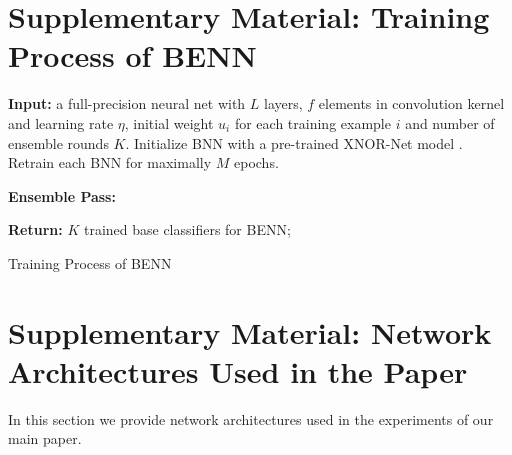\documentclass[10pt,twocolumn,letterpaper]{article}
\begin{document}
\newpage
\section{Supplementary Material: Training Process of BENN}
\label{sec:2}
\begin{algorithm}
	\SetAlgoLined
	\textbf{Input:} a full-precision neural net with $L$ layers, $f$ elements in convolution kernel and learning rate $\eta$, initial weight $u_{i}$ for each training example $i$ and number of ensemble rounds $K$. Initialize BNN with a pre-trained XNOR-Net model \cite{rastegari2016xnor}. Retrain each BNN for maximally $M$ epochs.
	
	\textbf{Ensemble Pass:}
	
	
    \textbf{Return:} $K$ trained base classifiers for BENN;
	
	\caption{Training Process of BENN}
\end{algorithm}

\newpage
\section{Supplementary Material: Network Architectures Used in the Paper}
\label{sec:3}
In this section we provide network architectures used in the experiments of our main paper.
\end{document}
